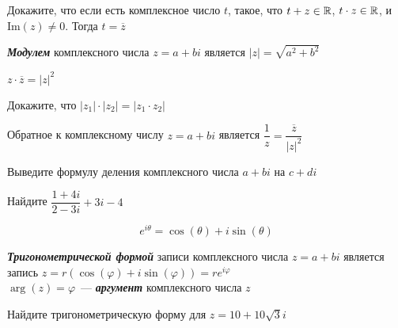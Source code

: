 \documentclass{article}
\begin{document}
    \begin{task_boxed}
        Докажите, что если есть комплексное число $t$, такое, что $t + z \in \mathbb{R}$, $t \cdot z \in \mathbb{R}$, и $\text{Im}(z) \neq 0$. Тогда $t = \overline{z}$
    \end{task_boxed}

    \begin{definition_boxed}
        \textbf{\textit{Модулем}} комплексного числа $z = a + bi$ является $|z| = \sqrt{a^2 + b^2}$
    \end{definition_boxed}

    \begin{example}
        $z \cdot \overline{z} = |z|^2$
    \end{example}

    \begin{task_boxed}
        Докажите, что $|z_1|\cdot|z_2| = |z_1\cdot z_2|$
    \end{task_boxed}

    \begin{definition_boxed}
        Обратное к комплексному числу $z = a + bi$ является $\dfrac{1}{z} = \dfrac{\overline{z}}{|z|^2}$
    \end{definition_boxed}

    \begin{task_boxed}
        Выведите формулу деления комплексного числа $a + bi$ на $c + di$
    \end{task_boxed}

    \begin{task_boxed}
        Найдите $\dfrac{1+4i}{2-3i} + 3i - 4$
    \end{task_boxed}

    \begin{theorem_boxed}[ Эйлера]
        \[e^{i\theta} = \cos(\theta) + i\sin(\theta)\]
    \end{theorem_boxed}

    \begin{definition_boxed}
        \textbf{\textit{Тригонометрической формой}} записи комплексного числа $z = a + bi$ является запись $z = r(\cos(\varphi) + i \sin(\varphi)) = re^{i\varphi}$\\
        $\arg(z) = \varphi$~--- \textbf{\textit{аргумент}} комплексного числа $z$
    \end{definition_boxed}

    \begin{task_boxed}
        Найдите тригонометрическую форму для $z=10+10\sqrt{3}i$
    \end{task_boxed}
\end{document}
